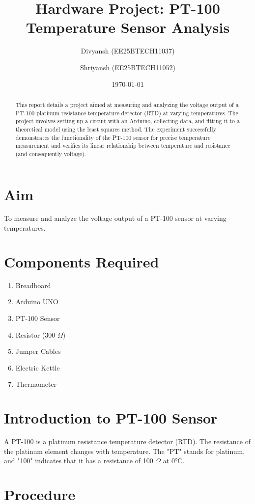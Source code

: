 \documentclass{article}
\title{Hardware Project: PT-100 Temperature Sensor Analysis}
\author{Divyansh (EE25BTECH11037) \and Shriyansh (EE25BTECH11052)}
\date{\today}
\begin{document}
	
	\maketitle
	
	\begin{abstract}
		This report details a project aimed at measuring and analyzing the voltage output of a PT-100 platinum resistance temperature detector (RTD) at varying temperatures. The project involves setting up a circuit with an Arduino, collecting data, and fitting it to a theoretical model using the least squares method. The experiment successfully demonstrates the functionality of the PT-100 sensor for precise temperature measurement and verifies its linear relationship between temperature and resistance (and consequently voltage).
	\end{abstract}
	
	\section{Aim}
	To measure and analyze the voltage output of a PT-100 sensor at varying temperatures.
	
	\section{Components Required}
	\begin{enumerate}
		\item Breadboard
		\item Arduino UNO
		\item PT-100 Sensor
		\item Resistor (300 $\Omega$)
		\item Jumper Cables
		\item Electric Kettle
		\item Thermometer
	\end{enumerate}
	
	\section{Introduction to PT-100 Sensor}
	A PT-100 is a platinum resistance temperature detector (RTD). The resistance of the platinum element changes with temperature. The "PT" stands for platinum, and "100" indicates that it has a resistance of 100 $\Omega$ at 0°C.
	
	\section{Procedure}
	
\end{document}
